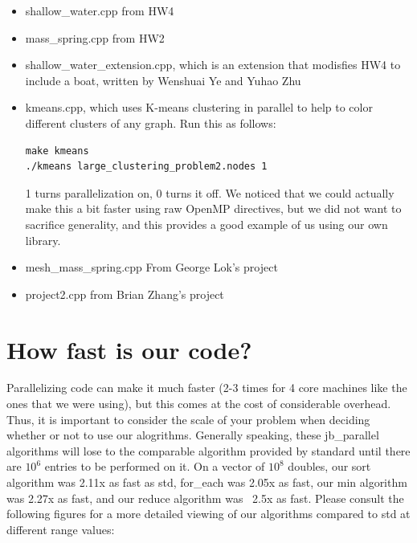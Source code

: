 \documentclass{article}
\begin{document}
\begin{itemize}
\item shallow\_water.cpp from HW4
\item mass\_spring.cpp from HW2
\item shallow\_water\_extension.cpp, which is an extension that modisfies HW4 to include a boat, written by Wenshuai Ye and Yuhao Zhu
\item kmeans.cpp, which uses K-means clustering in parallel to help to color different clusters of any graph.  Run this as follows:
\begin{verbatim}
make kmeans
./kmeans large_clustering_problem2.nodes 1
\end{verbatim}
1 turns parallelization on, 0 turns it off.  We noticed that we could actually make this a bit faster using raw OpenMP directives, but we did not want to sacrifice generality, and this provides a good example of us using our own library.
\item mesh\_mass\_spring.cpp From George Lok's project
\item project2.cpp from Brian Zhang's project
\end{itemize}

\section{How fast is our code?}
Parallelizing code can make it much faster (2-3 times for 4 core machines like the ones that we were using), but this comes at the cost of considerable overhead. Thus, it is important to consider the scale of your problem when deciding whether or not to use our alogrithms. Generally speaking, these jb\_parallel algorithms will lose to the comparable algorithm provided by standard until there are $10^6$ entries to be performed on it. On a vector of $10^8$ doubles, our sort algorithm was 2.11x as fast as std, for\_each was 2.05x as fast, our min algorithm was 2.27x as fast, and our reduce algorithm was  ~2.5x as fast. Please consult the following figures for a more detailed viewing of our algorithms compared to std at different range values:\\\\
\newpage
\end{document}
